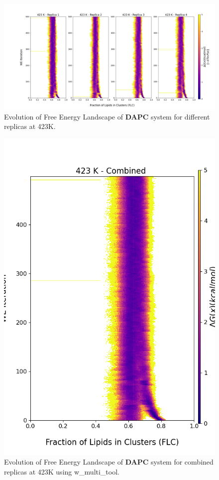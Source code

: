 \documentclass{biophys-new}
\begin{document}
\begin{figure}[hbt!]
\centering
\includegraphics[width=1.1\linewidth]{all_plots/ClusterLipids2Total/DPPC_DAPC_CHOL/423K/Evolution_DAPC_423_ClusterLipids2Total.png}
\caption{Evolution of Free Energy Landscape of \textbf{DAPC} system for different replicas at 423K.}
\label{fig:view}

\end{figure}

\begin{figure}[hbt!]
\centering
\includegraphics[width=0.8\linewidth]{all_plots/ClusterLipids2Total/DPPC_DAPC_CHOL/423K/Evolution_DAPC_MULTI__423_ClusterLipids2Total.png}
\caption{Evolution of Free Energy Landscape of \textbf{DAPC} system for combined replicas at 423K using w\_multi\_tool.}
\label{fig:view}

\end{figure}
\end{document}
